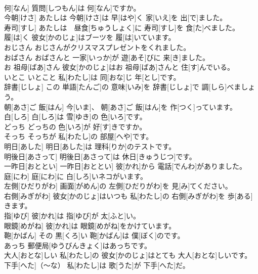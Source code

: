 \documentclass[8pt]{extreport}
\begin{document}
\begin{CJK}{UTF8}{min}
\\	何[なん]	質問[しつもん]は 何[なん]ですか。		
\\	今朝[けさ]	あたしは 今朝[けさ]は 早[はや]く 家[いえ]を 出[で]ました。		
\\	寿司[すし]	あたしは　昼食[ちゅうしょく]に 寿司[すし]を 食[た]べました。		
\\	履[は]く	彼女[かのじょ]はブーツを 履[は]いています。		
\\	おじさん	おじさんがクリスマスプレゼントをくれました。		
\\	おばさん	おばさんと 一家[いっか]が 遊[あそ]びに 来[き]ました。		
\\	お 祖母[ばあ]さん	彼女[かのじょ]はお 祖母[ばあ]さんと 住[す]んでいる。		
\\	いとこ	いとこと 私[わたし]は 同[おな]じ 年[とし]です。		
\\	辞書[じしょ]	この 単語[たんご]の 意味[いみ]を 辞書[じしょ]で 調[しら]べましょう。		
\\	朝[あさ]ご 飯[はん]	今[いま]、 朝[あさ]ご 飯[はん]を 作[つく]っています。		
\\	白[しろ]	白[しろ]は 雪[ゆき]の 色[いろ]です。		
\\	どっち	どっちの 色[いろ]が 好[す]きですか。		
\\	そっち	そっちが 私[わたし]の 部屋[へや]です。		
\\	明日[あした]	明日[あした]は 理科[りか]のテストです。		
\\	明後日[あさって]	明後日[あさって]は 休日[きゅうじつ]です。		
\\	一昨日[おととい]	一昨日[おととい] 彼[かれ]から 電話[でんわ]がありました。		
\\	庭[にわ]	庭[にわ]に 白[しろ]いネコがいます。		
\\	左側[ひだりがわ]	画面[がめん]の 左側[ひだりがわ]を 見[み]てください。		
\\	右側[みぎがわ]	彼女[かのじょ]はいつも 私[わたし]の 右側[みぎがわ]を 歩[ある]きます。		
\\	指[ゆび]	彼[かれ]は 指[ゆび]が 太[ふと]い。		
\\	眼鏡[めがね]	彼[かれ]は 眼鏡[めがね]をかけています。		
\\	鞄[かばん]	その 黒[くろ]い 鞄[かばん]は 僕[ぼく]のです。		
\\	あっち	郵便局[ゆうびんきょく]はあっちです。		
\\	大人[おとな]しい	私[わたし]の 彼女[かのじょ]はとても 大人[おとな]しいです。		
\\	下手[へた]（～な）	私[わたし]は 歌[うた]が 下手[へた]だ。		

\end{CJK}
\end{document}
